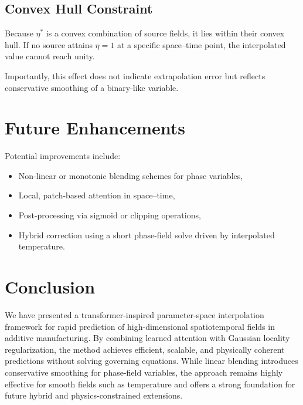 \documentclass[10pt]{article}
\begin{document}
\subsection{Convex Hull Constraint}

Because $\eta^*$ is a convex combination of source fields, it lies within their convex hull. If no source attains $\eta = 1$ at a specific space--time point, the interpolated value cannot reach unity.

Importantly, this effect does not indicate extrapolation error but reflects conservative smoothing of a binary-like variable.

\section{Future Enhancements}

Potential improvements include:
\begin{itemize}
\item Non-linear or monotonic blending schemes for phase variables,
\item Local, patch-based attention in space--time,
\item Post-processing via sigmoid or clipping operations,
\item Hybrid correction using a short phase-field solve driven by interpolated temperature.
\end{itemize}

\section{Conclusion}

We have presented a transformer-inspired parameter-space interpolation framework for rapid prediction of high-dimensional spatiotemporal fields in additive manufacturing. By combining learned attention with Gaussian locality regularization, the method achieves efficient, scalable, and physically coherent predictions without solving governing equations. While linear blending introduces conservative smoothing for phase-field variables, the approach remains highly effective for smooth fields such as temperature and offers a strong foundation for future hybrid and physics-constrained extensions.



\end{document}
